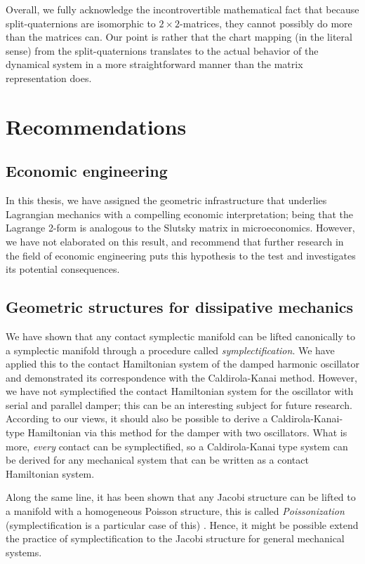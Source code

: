 Overall, we fully acknowledge the incontrovertible mathematical fact that because split-quaternions are isomorphic to $2\times2$-matrices, they cannot possibly do more than the matrices can. Our point is rather that the chart mapping (in the literal sense) from the split-quaternions translates to the actual behavior of the dynamical system in a more straightforward manner than the matrix representation does.

\section*{Recommendations}

\subsection*{Economic engineering}
In this thesis, we have assigned the geometric infrastructure that underlies Lagrangian mechanics with a compelling economic interpretation; being that the Lagrange 2-form is analogous to the Slutsky matrix in microeconomics. However, we have not elaborated on this result, and recommend that further research in the field of economic engineering puts this hypothesis to the test and investigates its potential consequences.

\subsection*{Geometric structures for dissipative mechanics}
We have shown that any contact symplectic manifold can be lifted canonically to a symplectic manifold through a procedure called \emph{symplectification}. We have applied this to the contact Hamiltonian system of the damped harmonic oscillator and demonstrated its correspondence with the Caldirola-Kanai method. However, we have not symplectified the contact Hamiltonian system for the oscillator with serial and parallel damper; this can be an interesting subject for future research. According to our views, it should also be possible to derive a Caldirola-Kanai-type Hamiltonian via this method for the damper with two oscillators. What is more, \emph{every} contact can be symplectified, so a Caldirola-Kanai type system can be derived for any mechanical system that can be written as a contact Hamiltonian system.

Along the same line, it has been shown that any Jacobi structure can be lifted to a manifold with a homogeneous Poisson structure, this is called \emph{Poissonization} (symplectification is a particular case of this) \cite{marle1991}. Hence, it might be possible extend the practice of symplectification to the Jacobi structure for general mechanical systems. 

